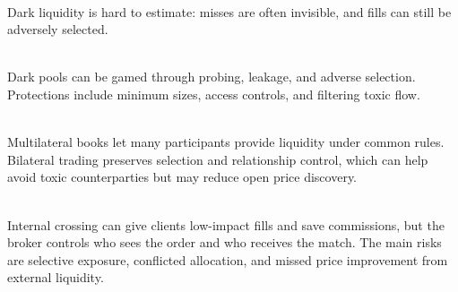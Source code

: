 \documentclass[a4paper,oneside,openany]{book}
\begin{document}
\begin{caveat} \\
Dark liquidity is hard to estimate: misses are often invisible, and fills can still be adversely selected.
\end{caveat}

\begin{caveat} \\
Dark pools can be gamed through probing, leakage, and adverse selection. Protections include minimum sizes, access controls, and filtering toxic flow.
\end{caveat}

\begin{taxonomy} \\
Multilateral books let many participants provide liquidity under common rules. Bilateral trading preserves selection and relationship control, which can help avoid toxic counterparties but may reduce open price discovery.
\end{taxonomy}

\begin{caveat} \\
Internal crossing can give clients low-impact fills and save commissions, but the broker controls who sees the order and who receives the match. The main risks are selective exposure, conflicted allocation, and missed price improvement from external liquidity.
\end{caveat}
\end{document}
